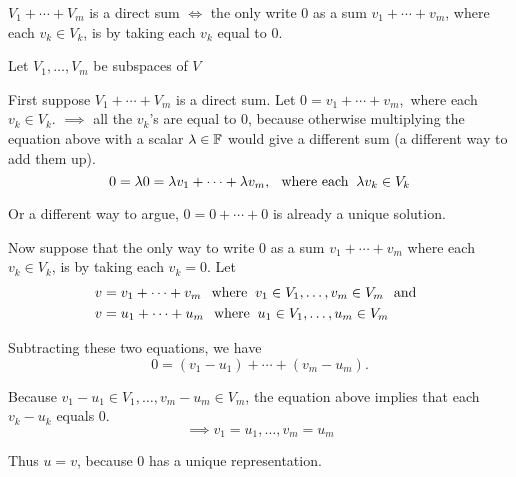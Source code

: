 \setcounter{thm}{44}
\begin{thm} 
  \label{thm: condition for a direct sum}
  $V_1 + \cdots + V_m$ is a direct sum $\iff$ the only write $0$ as a sum $v_1 + \cdots + v_m$, where each $v_k \in V_k$, is by taking each $v_k$ equal to $0$.
\end{thm}
\begin{prf}
    Let  $V_1, \ldots, V_m$ be subspaces of $V$

     First suppose $V_1 + \cdots + V_m$ is a direct sum. Let $0 = v_1 + \cdots + v_m,$ where each $v_k \in V_k$.
    $\implies$ all the $v_k$'s are equal to $0$, because otherwise multiplying the equation above with a scalar $\lambda \in \mathbb{F}$ would give a different sum (a different way to add them up).
    \begin{equation}
      0 = \lambda0= \lambda v_1 + \cdots + \lambda v_m, \;\;\, \text{where each}\;\; \lambda v_k \in V_k
    \end{equation}

    Or a different way to argue, $0 = 0 + \cdots + 0$ is already a unique solution.

     Now suppose that the only way to write $0$ as a sum $v_1 + \cdots + v_m$ where each $v_k \in V_k$, is by taking each $v_k = 0$. Let
    \begin{equation}
      \begin{aligned}
        v&=v_1 + \cdots + v_m \;\;\, \text{where}\;\; v_1 \in V_1, \ldots, v_m \in V_m \;\;\, \text{and}\;\; \\
        v&=u_1 + \cdots + u_m  \;\;\, \text{where}\;\; u_1 \in V_1, \ldots, u_m \in V_m
      \end{aligned}
    \end{equation}

    Subtracting these two equations, we have
    \begin{equation}
      0=(v_1-u_1)+\cdots+(v_m-u_m).
    \end{equation}

    Because $v_1 - u_1 \in V_1, \ldots, v_m - u_m \in V_m$, the equation above implies that each $v_k -u_k$ equals $0$.
    \begin{equation}
      \implies v_1=u_1, \ldots, v_m=u_m
    \end{equation}

    Thus $u=v$, because $0$ has a unique representation.
\end{prf}

